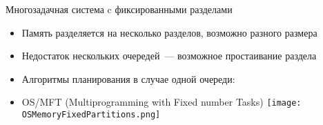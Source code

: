 \documentclass[aspectratio=169,14pt]{beamer}
\begin{document}
\begin{frame}{Многозадачная система c фиксированными разделами}
    \begin{footnotesize}
    \begin{spacing}{0.8}
    \begin{itemize}
        \item Память разделяется на несколько разделов, возможно
        разного размера
        \begin{itemize}
        \end{itemize}
        \item Недостаток нескольких очередей~--- возможное простаивание
        раздела
        \item Алгоритмы планирования в случае одной очереди:
        \begin{itemize}
            \begin{tiny}
            \end{tiny}
        \end{itemize}
        \item OS/MFT (Multiprogramming with Fixed number Tasks)
        \texttt{[image: OSMemoryFixedPartitions.png]}
    \end{itemize}
    \end{spacing}
    \end{footnotesize}
\end{frame}
\end{document}
